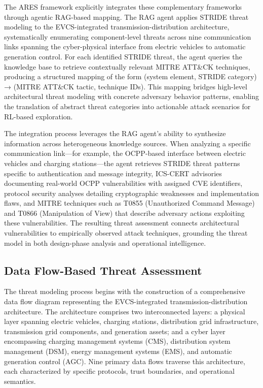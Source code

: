 The ARES framework explicitly integrates these complementary frameworks through agentic RAG-based mapping. The RAG agent applies STRIDE threat modeling to the EVCS-integrated transmission-distribution architecture, systematically enumerating component-level threats across nine communication links spanning the cyber-physical interface from electric vehicles to automatic generation control. For each identified STRIDE threat, the agent queries the knowledge base to retrieve contextually relevant MITRE ATT\&CK techniques, producing a structured mapping of the form (system element, STRIDE category) → (MITRE ATT\&CK tactic, technique IDs). This mapping bridges high-level architectural threat modeling with concrete adversary behavior patterns, enabling the translation of abstract threat categories into actionable attack scenarios for RL-based exploration.

The integration process leverages the RAG agent's ability to synthesize information across heterogeneous knowledge sources. When analyzing a specific communication link—for example, the OCPP-based interface between electric vehicles and charging stations—the agent retrieves STRIDE threat patterns specific to authentication and message integrity, ICS-CERT advisories documenting real-world OCPP vulnerabilities with assigned CVE identifiers, protocol security analyses detailing cryptographic weaknesses and implementation flaws, and MITRE techniques such as T0855 (Unauthorized Command Message) and T0866 (Manipulation of View) that describe adversary actions exploiting these vulnerabilities. The resulting threat assessment connects architectural vulnerabilities to empirically observed attack techniques, grounding the threat model in both design-phase analysis and operational intelligence.

\subsection{Data Flow-Based Threat Assessment}

The threat modeling process begins with the construction of a comprehensive data flow diagram representing the EVCS-integrated transmission-distribution architecture. The architecture comprises two interconnected layers: a physical layer spanning electric vehicles, charging stations, distribution grid infrastructure, transmission grid components, and generation assets; and a cyber layer encompassing charging management systems (CMS), distribution system management (DSM), energy management systems (EMS), and automatic generation control (AGC). Nine primary data flows traverse this architecture, each characterized by specific protocols, trust boundaries, and operational semantics.

